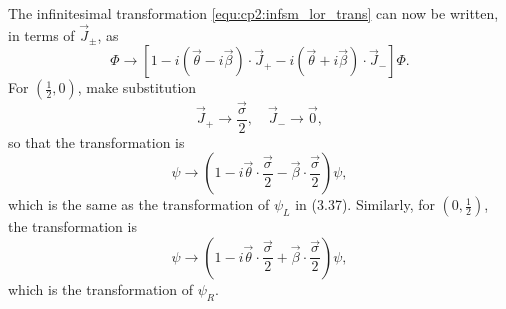 \begin{problembody}
    \item The infinitesimal transformation \eqref{equ:cp2:infsm_lor_trans} can now be written, in terms of $\vec{J}_\pm$, as
    \begin{equation}\label{equ:cp3:lor_uni_trans}
        \Phi \to \left[1 - i\left(\vec{\theta} - i\vec{\beta}\right)\cdot\vec{J}_+ - i\left(\vec{\theta} + i\vec{\beta}\right)\cdot\vec{J}_-\right] \Phi.
    \end{equation}
    For $(\frac{1}{2}, 0)$, make substitution
    \begin{equation*}
        \vec{J}_+ \to \frac{\vec{\sigma}}{2}, \quad \vec{J}_- \to \vec{0},
    \end{equation*}
    so that the transformation is
    \begin{equation}\label{equ:cp3:spinor_trans_L}
        \psi \to \left(1 - i\vec{\theta}\cdot\frac{\vec{\sigma}}{2} - \vec{\beta}\cdot\frac{\vec{\sigma}}{2}\right)\psi,
    \end{equation}
    which is the same as the transformation of $\psi_L$ in (3.37). Similarly, for $(0, \frac{1}{2})$, the transformation is
    \begin{equation*}
        \psi \to \left(1 - i\vec{\theta}\cdot\frac{\vec{\sigma}}{2} + \vec{\beta}\cdot\frac{\vec{\sigma}}{2}\right) \psi,
    \end{equation*}
    which is the transformation of $\psi_R$.


\end{problembody}
